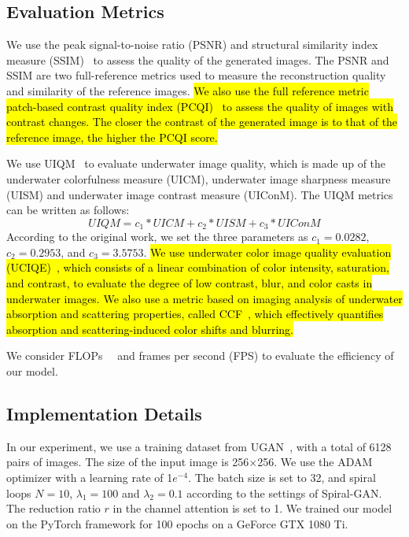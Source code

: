 \documentclass[utf8]{FrontiersinHarvard} %
\begin{document}
\subsection{Evaluation Metrics}
We use the peak signal-to-noise ratio (PSNR) and structural similarity index measure (SSIM)~\citep{A2010Image} to assess the quality of the generated images. The PSNR and SSIM are two full-reference metrics used to measure the reconstruction quality and similarity of the reference images. \hl{We also use the full reference metric patch-based contrast quality index (PCQI)~\citep{wang2015patch} to assess the quality of images with contrast changes. The closer the contrast of the generated image is to that of the reference image, the higher the PCQI score.
} 

We use UIQM~\citep{7305804} to evaluate underwater image quality, which is made up of the underwater colorfulness measure (UICM), underwater image sharpness measure (UISM) and underwater image contrast measure (UIConM). The UIQM metrics can be written as follows:
\begin{equation}
UIQM = c_{1}*UICM + c_{2}*UISM + c_{3}*UIConM
\label{con:UIQM}
\end{equation}
According to the original work, we set the three parameters as $c_{1}=0.0282$, $c_{2}=0.2953$, and $c_{3}=3.5753$. \hl{
We use underwater color image quality evaluation (UCIQE)~\citep{yang2015underwater}, which consists of a linear combination of color intensity, saturation, and contrast, to evaluate the degree of low contrast, blur, and color casts in underwater images. We also use a metric based on imaging analysis of underwater absorption and scattering properties, called CCF~\citep{wang2018imaging}, which effectively quantifies absorption and scattering-induced color shifts and blurring.}

We consider FLOPs~\citep{2016Deep}~\citep{2019EfficientNet} and frames per second (FPS) to evaluate the efficiency of our model. 

\subsection{Implementation Details}
In our experiment, we use a training dataset from UGAN~\citep{8460552}, with a total of 6128 pairs of images. The size of the input image is 256$\times$256. We use the ADAM optimizer with a learning rate of 1$e^{-4}$. The batch size is set to 32, and spiral loops $N=10$, $\lambda_{1}=100$ and $\lambda_{2}=0.1$ according to the settings of Spiral-GAN. The reduction ratio $r$ in the channel attention is set to 1. We trained our model on the PyTorch framework for 100 epochs on a GeForce GTX 1080 Ti.
\end{document}
